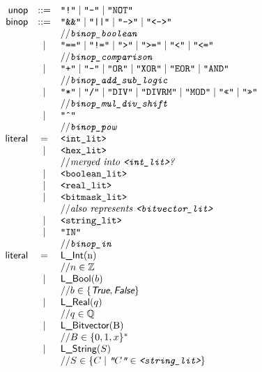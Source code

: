 \documentclass{book}
\begin{document}
\[
\begin{array}{rcl}
\unop &::=& \texttt{"!"} \;|\; \texttt{"-"} \;|\; \texttt{"NOT"} \\
\binop &::=& \texttt{"\&\&"} \;|\; \texttt{"||"} \;|\; \texttt{"-->"} \;|\;  \texttt{"<->"}  \\
 & & \ASTComment{\texttt{binop\_boolean}}\\

 &|& \texttt{"=="} \;|\; \texttt{"!="}  \;|\; \texttt{">"}  \;|\; \texttt{">="} \;|\; \texttt{"<"} \;|\; \texttt{"<="}   \\
 & & \ASTComment{\texttt{binop\_comparison}}\\

 &|& \texttt{"+"} \;|\; \texttt{"-"}  \;|\; \texttt{"OR"}  \;|\; \texttt{"XOR"} \;|\; \texttt{"EOR"} \;|\; \texttt{"AND"}   \\
 & & \ASTComment{\texttt{binop\_add\_sub\_logic}}\\

 &|& \texttt{"*"} \;|\; \texttt{"/"}  \;|\; \texttt{"DIV"}  \;|\; \texttt{"DIVRM"} \;|\; \texttt{"MOD"}  \;|\; \texttt{"<<"}  \;|\; \texttt{">>"}    \\
 & & \ASTComment{\texttt{binop\_mul\_div\_shift}}\\

 &|& \texttt{"\^{}"}   \\
 & & \ASTComment{\texttt{binop\_pow}}\\

\literal &=& \texttt{<int\_lit>}  \\
 &|&\texttt{<hex\_lit>} \\
 & & \ASTComment{merged into \texttt{<int\_lit>}?}\\
 &|&\texttt{<boolean\_lit>}  \\
 &|& \texttt{<real\_lit>}  \\
 &|& \texttt{<bitmask\_lit>}   \\
 & & \ASTComment{also represents \texttt{<bitvector\_lit>}}\\
 &|&\texttt{<string\_lit>} \\
 &|& \texttt{"IN"}   \\
 & & \ASTComment{\texttt{binop\_in}}\\

\literal &=& \lint($n$) \\
 & & \ASTComment{$n \in \Z$}\\
 &|& \lbool(b) \\
 & & \ASTComment{$b \in \{\True, \False\}$}\\
 &|& \lreal(q)  \\
 & & \ASTComment{$q \in \Q$}\\
 &|& \lbitvector($B$)   \\
 & & \ASTComment{$B \in \{0, 1, x\}^*$}\\
 &|& \lstring(S)\\
 & & \ASTComment{$S \in \{C \;|\; \texttt{"$C$"} \in \texttt{<string\_lit>}\} $}\\
\end{array}
\]
\end{document}
